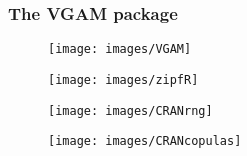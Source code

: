 \documentclass[MAIN.tex]{subfiles}
\begin{document}
\begin{frame}
\frametitle{The VGAM package}
	\begin{figure}
\centering
\texttt{[image: images/VGAM]}

\end{figure}

\end{frame}
\begin{frame}
	\begin{figure}
\centering
\texttt{[image: images/zipfR]}

\end{figure}

\end{frame}
\begin{frame}
	
\begin{figure}
\centering
\texttt{[image: images/CRANrng]}
\end{figure}

\end{frame}
\begin{frame}
	\begin{figure}
\centering
\texttt{[image: images/CRANcopulas]}

\end{figure}

\end{frame}
\end{document}
